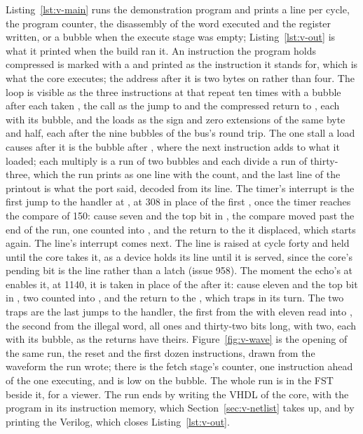 \documentclass[journal,onecolumn,9pt]{IEEEtran}
\begin{document}
Listing~\ref{lst:v-main} runs the demonstration program and prints a
line per cycle, the program counter, the disassembly of the word
executed and the register written, or a bubble when the execute
stage was empty; Listing~\ref{lst:v-out} is what it printed when the
build ran it. An instruction the program holds compressed is marked
with a  and printed as the instruction it stands for, which
is what the core executes; the address after it is two bytes on
rather than four. The loop is visible as the three
instructions at  that repeat ten times with a bubble after
each taken , the call as the jump to  and the
compressed return to , each with its bubble, and the loads
as the sign and zero extensions of the same byte and half, each after
the nine bubbles of the bus's round trip. The one stall a load causes
after it is the bubble after , where the next instruction
adds to what it loaded; each multiply is a run of two bubbles and
each divide a run of thirty-three, which the run prints as one line
with the count, and the last line of the printout is what the port
said, decoded from its line. The timer's interrupt is the first jump
to the handler at , at  308 in place of the first
, once the timer reaches the compare of 150: cause seven
and the top bit in , the compare moved past the end of the
run, one counted into , and the return to the  it
displaced, which starts again. The line's interrupt comes next. The
line is raised at cycle forty and held until the core takes it, as a
device holds its line until it is served, since the core's pending
bit is the line rather than a latch (issue 958). The moment the echo's
 at  enables it, at  1140, it is taken
in place of the  after it: cause eleven and the top bit in
, two counted into , and the return to the
, which traps in its turn. The two traps are the
last jumps to the handler, the first from the  with
eleven read into , the second from the illegal word, all
ones and thirty-two bits long, with two, each with its bubble, as the
returns have theirs. Figure~\ref{fig:v-wave} is the opening of the same run, the reset
and the first dozen instructions, drawn from the waveform the run
wrote;  there is the fetch
stage's counter, one instruction ahead of the one executing, and
 is low on the bubble. The whole run is in the FST beside
it, for a viewer. The run ends by writing the VHDL of the core, with
the program in its instruction memory, which Section~\ref{sec:v-netlist}
takes up, and by printing the Verilog, which closes
Listing~\ref{lst:v-out}.
\end{document}
